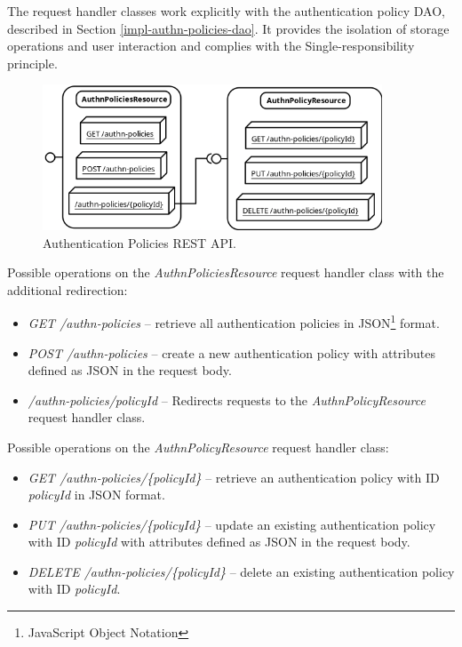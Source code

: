 The request handler classes work explicitly with the authentication policy DAO, described in Section \ref{impl-authn-policies-dao}.
It provides the isolation of storage operations and user interaction and complies with the Single-responsibility principle.\cite{impl-single-responsibility}

\begin{figure}[htbp]
  \centering
  \includegraphics[width=0.9\textwidth]{img/sections/6-implementation/rest.png}
  \caption{Authentication Policies REST API.}
  \label{fig:impl-authn-policies-rest}
\end{figure}

Possible operations on the \textit{AuthnPoliciesResource} request handler class with the additional redirection:
\begin{itemize}
    \item \textit{GET /authn-policies} -- retrieve all authentication policies in JSON\footnote{JavaScript Object Notation} format. 
    \item \textit{POST /authn-policies} -- create a new authentication policy with attributes defined as JSON in the request body.  
    \item \textit{/authn-policies/{policyId}} -- Redirects requests to the \textit{AuthnPolicyResource} request handler class.
\end{itemize}

Possible operations on the \textit{AuthnPolicyResource} request handler class:

\begin{itemize}
    \item \textit{GET /authn-policies/\{policyId\}} -- retrieve an authentication policy with ID \textit{policyId} in JSON format.
    \item \textit{PUT /authn-policies/\{policyId\}} -- update an existing authentication policy with ID \textit{policyId} with attributes defined as JSON in the request body.
    \item \textit{DELETE /authn-policies/\{policyId\}} -- delete an existing authentication policy with ID \textit{policyId}.
\end{itemize}

